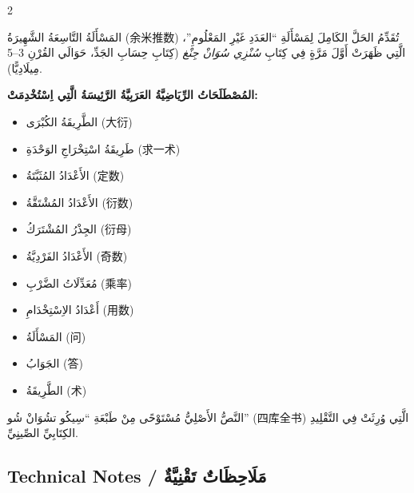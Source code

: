 \documentclass[11pt,a4paper]{article}
\newcommand{\ar}[1]{\arabicfont\beginR #1\endR}
\providecommand{\enquote}[1]{``#1''}
\newenvironment{bilingual}{%
  \begin{paracol}{2}
}{%
  \end{paracol}
}
\begin{document}
\begin{bilingual}
\begin{rightcolumn*}
\ar{المَسْأَلَةُ التَّاسِعَةُ الشَّهِيرَةُ (余米推数) تُقَدِّمُ الحَلَّ الكَامِلَ لِمَسْأَلَةِ \enquote{العَدَدِ غَيْرِ المَعْلُومِ}، الَّتِي ظَهَرَتْ أَوَّلَ مَرَّةٍ فِي كِتَابِ \textit{سُنْزِي سُوَانْ جِنْغ} (كِتَابِ حِسَابِ الجَدِّ، حَوَالَي القُرْنِ 3--5 مِيلَادِيًّا).}

\ar{\textbf{المُصْطَلَحَاتُ الرِّيَاضِيَّةُ العَرَبِيَّةُ الرَّئِيسَةُ الَّتِي اِسْتُخْدِمَتْ:}}
\begin{itemize}
  \item \ar{الطَّرِيقَةُ الكُبْرَى (大衍)}
  \item \ar{طَرِيقَةُ اسْتِخْرَاجِ الوَحْدَةِ (求一术)}
  \item \ar{الأَعْدَادُ المُثَبَّتَةُ (定数)}
  \item \ar{الأَعْدَادُ المُشْتَقَّةُ (衍数)}
  \item \ar{الجِذْرُ المُشْتَرَكُ (衍母)}
  \item \ar{الأَعْدَادُ الفَرْدِيَّةُ (奇数)}
  \item \ar{مُعَدِّلَاتُ الضَّرْبِ (乘率)}
  \item \ar{أَعْدَادُ الاِسْتِخْدَامِ (用数)}
  \item \ar{المَسْأَلَةُ (问)}
  \item \ar{الجَوَابُ (答)}
  \item \ar{الطَّرِيقَةُ (术)}
\end{itemize}

\ar{النَّصُّ الأَصْلِيُّ مُسْتَوْحًى مِنْ طَبْعَةِ \enquote{سِيكُو تشُوَانْ شُو} (四库全书) الَّتِي وُرِثَتْ فِي التَّقْلِيدِ الكِتَابِيِّ الصِّينِِيِّ.}
\end{rightcolumn*}

\end{bilingual}

\vspace{1em}

\subsection*{Technical Notes / \ar{مَلَاحِظَاتٌ تَقْنِيَّةٌ}}
\end{document}
